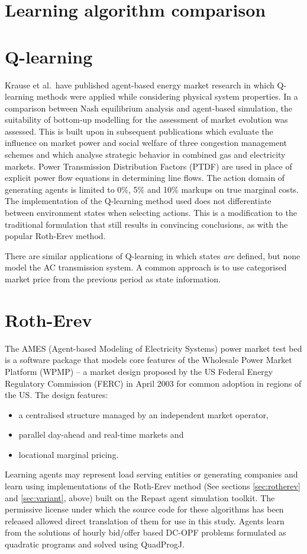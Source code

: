\section{Learning algorithm comparison}

\section{Q-learning}
Krause et al.\ have published agent-based energy market research in which
Q-learning methods were applied while considering physical system properties.
In a comparison between Nash equilibrium analysis and agent-based simulation,
the suitability of bottom-up modelling for the assessment of market evolution
was assessed\cite{krause:nash}.  This is built upon in subsequent publications
which evaluate the influence on market power and social welfare of three
congestion management schemes and which analyse strategic behavior in combined
gas and electricity markets\cite{krause:cong,krause:gas}.  Power Transmission
Distribution Factors (PTDF) are used in place of explicit power flow equations
in determining line flows.  The action domain of generating agents is limited
to 0\%, 5\% and 10\% markups on true marginal costs.  The implementation of the
Q-learning method used does not differentiate between environment states when
selecting actions. This is a modification to the traditional formulation that
still results in convincing conclusions, as with the popular Roth-Erev method.

There are similar applications of Q-learning in which states \textit{are}
defined, but none model the AC transmission system.  A common approach is to
use categorised market price from the previous period as state
information\cite{bakirtzis:psce,xiong:discrim}.

\section{Roth-Erev}
The AMES (Agent-based Modeling of Electricity Systems) power market test bed is
a software package that models core features of the Wholesale Power Market
Platform (WPMP) -- a market design proposed by the US Federal Energy Regulatory
Commission (FERC) in April 2003 for common adoption in regions of the
US\cite{tesfatsi:wpmp}. The design features:
\begin{itemize}
  \item a centralised structure managed by an independent market operator,
  \item parallel day-ahead and real-time markets and
  \item locational marginal pricing.
\end{itemize}
Learning agents may represent load serving entities or generating companies and
learn using implementations of the Roth-Erev method (See sections
\ref{sec:rotherev} and \ref{sec:variant}, above) built on the Repast agent
simulation toolkit\cite{gieseler:thesis}.  The permissive license under which
the source code for these algorithms has been released allowed direct
translation of them for use in this study.  Agents learn from the solutions of
hourly bid/offer based DC-OPF problems formulated as quadratic programs and
solved using QuadProgJ\cite{tesfatsi:dcopf}.

